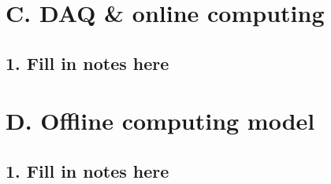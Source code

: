 \documentclass{report}
\begin{document}
\section{C. DAQ \& online computing}
\subsection{1. Fill in notes here}
%
\section{D. Offline computing model}
\subsection{1. Fill in notes here}
\end{document}
